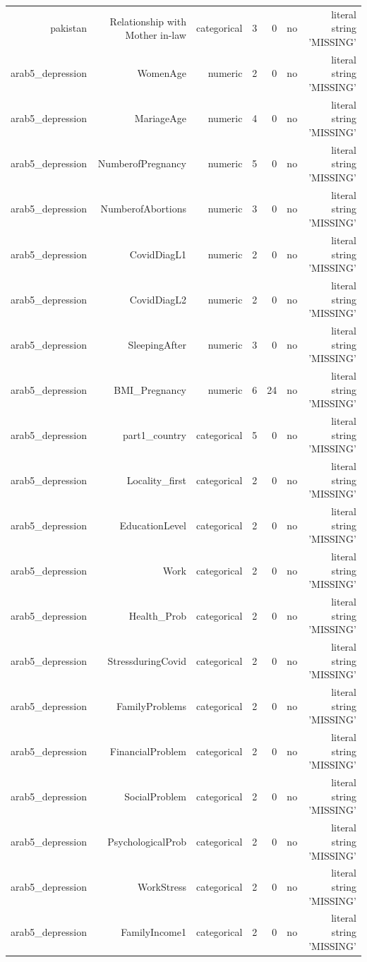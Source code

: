 \documentclass[10pt]{article}
\begin{document}
\begin{longtable}{rrrrrrr}
pakistan & Relationship with Mother in-law & categorical & 3 & 0 & no & literal string 'MISSING' \\
arab5\_depression & WomenAge & numeric & 2 & 0 & no & literal string 'MISSING' \\
arab5\_depression & MariageAge & numeric & 4 & 0 & no & literal string 'MISSING' \\
arab5\_depression & NumberofPregnancy & numeric & 5 & 0 & no & literal string 'MISSING' \\
arab5\_depression & NumberofAbortions & numeric & 3 & 0 & no & literal string 'MISSING' \\
arab5\_depression & CovidDiagL1 & numeric & 2 & 0 & no & literal string 'MISSING' \\
arab5\_depression & CovidDiagL2 & numeric & 2 & 0 & no & literal string 'MISSING' \\
arab5\_depression & SleepingAfter & numeric & 3 & 0 & no & literal string 'MISSING' \\
arab5\_depression & BMI\_Pregnancy & numeric & 6 & 24 & no & literal string 'MISSING' \\
arab5\_depression & part1\_country & categorical & 5 & 0 & no & literal string 'MISSING' \\
arab5\_depression & Locality\_first & categorical & 2 & 0 & no & literal string 'MISSING' \\
arab5\_depression & EducationLevel & categorical & 2 & 0 & no & literal string 'MISSING' \\
arab5\_depression & Work & categorical & 2 & 0 & no & literal string 'MISSING' \\
arab5\_depression & Health\_Prob & categorical & 2 & 0 & no & literal string 'MISSING' \\
arab5\_depression & StressduringCovid & categorical & 2 & 0 & no & literal string 'MISSING' \\
arab5\_depression & FamilyProblems & categorical & 2 & 0 & no & literal string 'MISSING' \\
arab5\_depression & FinancialProblem & categorical & 2 & 0 & no & literal string 'MISSING' \\
arab5\_depression & SocialProblem & categorical & 2 & 0 & no & literal string 'MISSING' \\
arab5\_depression & PsychologicalProb & categorical & 2 & 0 & no & literal string 'MISSING' \\
arab5\_depression & WorkStress & categorical & 2 & 0 & no & literal string 'MISSING' \\
arab5\_depression & FamilyIncome1 & categorical & 2 & 0 & no & literal string 'MISSING' \\

\end{longtable}
\end{document}

